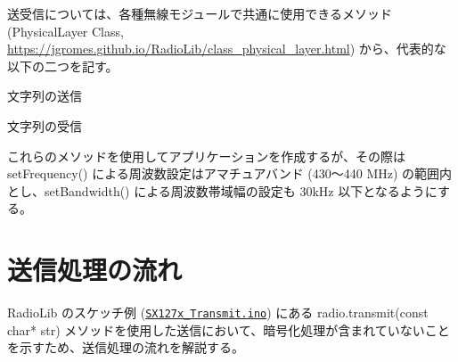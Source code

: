 \documentclass[a4j,oneside]{ujbook}
\begin{document}
送受信については、各種無線モジュールで共通に使用できるメソッド (PhysicalLayer Class, \url{https://jgromes.github.io/RadioLib/class_physical_layer.html}) から、代表的な以下の二つを記す。

\begin{description}[style=sameline]
 \item[transmit()] 文字列の送信
 \item[receive()] 文字列の受信
\end{description}

これらのメソッドを使用してアプリケーションを作成するが、その際は setFrequency() による周波数設定はアマチュアバンド (430〜440 MHz) の範囲内とし、setBandwidth() による周波数帯域幅の設定も 30kHz 以下となるようにする。

\section*{送信処理の流れ}

RadioLib のスケッチ例 (\href{https://github.com/jgromes/RadioLib/blob/master/examples/SX127x/SX127x_Transmit/SX127x_Transmit.ino}{\tt{SX127x\_Transmit.ino}}) にある radio.transmit(const char* str) メソッドを使用した送信において、暗号化処理が含まれていないことを示すため、送信処理の流れを解説する。
\end{document}
